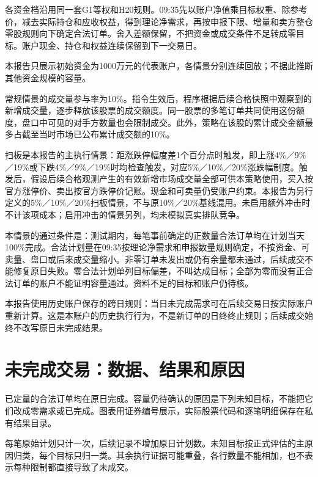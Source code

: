 \documentclass[UTF8,10pt,a4paper,fontset=fandol]{ctexart}
\begin{document}
各资金档沿用同一套G1等权和H20规则。09:35先以账户净值乘目标权重、除参考价，减去实际持仓和应收权益，得到理论净需求，再按申报下限、增量和卖方整仓零股规则向下确定合法订单。舍入差额保留，不把资金或成交条件不足转成零目标。账户现金、持仓和权益连续保留到下一交易日。

本报告只展示初始资金为1000万元的代表账户，各情景分别连续回放；不据此推断其他资金规模的容量。

常规情景的成交量参与率为10\%。指令生效后，程序根据后续合格快照中观察到的新增成交量，逐步释放该股票的成交额度。同一股票的多笔订单共同使用这份额度，盘口中可见的对手方数量也会限制成交。此外，策略在该股的累计成交金额最多占截至当时市场已公布累计成交额的10\%。

扫板是本报告的主执行情景：距涨跌停幅度差1个百分点时触发，即上涨4\%／9\%／19\%或下跌4\%／9\%／19\%时均检查触发，对应5\%／10\%／20\%涨跌幅制度。触发后，假设后续合格观测产生的有效新增市场成交量全部可供本策略使用，买入按官方涨停价、卖出按官方跌停价记账。现金和可卖量仍受账户约束。本报告为另行定义的5\%／10\%／20\%扫板情景，不与原10\%／20\%基线混用。未启用额外冲击时不计该项成本；启用冲击的情景另列，均未模拟真实排队竞争。

本情景的通过条件是：测试期内，每笔事前确定的正数量合法订单均在计划当天100\%完成。合法计划量在09:35按理论净需求和申报数量规则确定，不按资金、可卖量、盘口或后来成交量缩小。非零订单未发出或仍有余量都未通过，后续成交不能修复原日失败。零合法计划单列目标偏差，不叫达成目标；全部为零而没有正合法订单的账户不能证明容量通过。资料不足的目标和账户仍待核。

本报告使用历史账户保存的跨日规则：当日未完成需求可在后续交易日按实际账户重新计算。这是本账户的历史执行行为，不是新订单的日终终止规则；后续成交始终不改写原日未完成结果。

\section*{未完成交易：数据、结果和原因}
已定量的合法订单均在原日完成。容量仍待确认的原因是下列未知目标，不能把它们改成零需求或已完成。图表用证券编号展示，实际股票代码和逐笔明细保存在私有结果目录。



每笔原始计划只计一次，后续记录不增加原日计划数。未知目标按正式评估的主原因归类，每个目标只归一类。其余执行证据可能重叠，各行数量不能相加，也不表示每种限制都直接导致了未成交。
\end{document}
